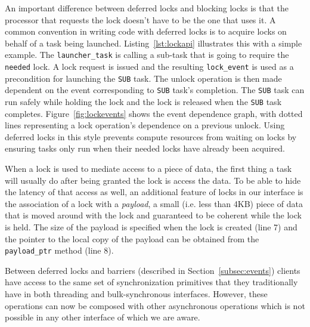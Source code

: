 An important difference between deferred locks and blocking locks is that the processor
that requests the lock doesn't have to be the one that uses it.  A common
convention in writing code with deferred locks is to acquire locks on behalf of a task being
launched.  Listing~\ref{lst:lockapi} illustrates this with a simple example.  The
{\tt launcher\_task} is calling a sub-task that is going to require the {\tt needed}
lock.  A lock request is issued and the resulting {\tt lock\_event} is used as
a precondition for launching the {\tt SUB} task.  The unlock operation is then
made dependent
on the event corresponding to {\tt SUB} task's completion.  The
{\tt SUB} task can run safely while holding the lock and the lock is released when the
{\tt SUB} task completes.  Figure~\ref{fig:lockevents} shows the event dependence graph, with
dotted lines representing a lock operation's dependence on a previous unlock.
Using deferred locks in this style prevents 
compute resources from waiting on locks by ensuring tasks only run when their needed
locks have already been acquired.

When a lock is used to mediate access to a piece of data, the first thing a task will usually
do after being granted the lock is access the data.  To be able to hide the latency of that
access as well, an additional feature of locks in our interface is the association of a lock with a
{\em payload}, a small (i.e. less than 4KB) 
piece of data that is moved around with the lock and guaranteed to be coherent while 
the lock is held.  The size of the payload is specified when the lock is created (line 7) and
the pointer to the local copy of the payload can be obtained from the {\tt payload\_ptr} method
(line 8).

Between deferred locks and barriers (described in Section~\ref{subsec:events}) clients 
have access to the same set of synchronization primitives that they traditionally have
in both threading and bulk-synchronous interfaces.  However, these operations can now 
be composed with other asynchronous operations which is not possible in any other interface
of which we are aware.



